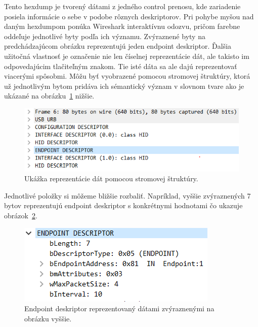 Tento hexdump je tvorený dátami z jedného control prenosu, kde zariadenie posiela informácie o sebe v podobe rôznych deskriptorov. Pri pohybe myšou nad daným hexdumpom ponúka Wireshark interaktívnu odozvu, pričom farebne oddeľuje jednotlivé byty podľa ich významu. Zvýraznené byty na predchádzajúcom obrázku reprezentujú jeden endpoint deskriptor. Ďalšia užitočná vlastnosť je označenie nie len číselnej reprezentácie dát, ale takisto im odpovedajúcim tlačiteľným znakom. Tie isté dáta sa ale dajú reprezentovať viacerými spôsobmi. Môžu byť vyobrazené pomocou stromovej štruktúry, ktorá už jednotlivým bytom pridáva ich sémantický význam v slovnom tvare ako je ukázané na obrázku~\ref{obr:uvod:tree_structure} nižšie.

\begin{figure}[!htb]
	\centering
	\includegraphics[width=\textwidth]{img/uvod_tree_structure}
	\caption{Ukážka reprezentácie dát pomocou stromovej štruktúry.}
	\label{obr:uvod:tree_structure}
\end{figure}

\newpage

 Jednotlivé položky si môžeme bližšie rozbaliť. Napríklad, vyššie zvýraznených 7 bytov reprezentujú endpoint deskriptor s konkrétnymi hodnotami čo ukazuje obrázok~\ref{obr:uvod:endpoint}.

\begin{figure}[!htb]
	\centering
	\includegraphics[width=\textwidth]{img/uvod_endpoint}
	\caption{Endpoint deskriptor reprezentovaný dátami zvýraznenými na obrázku vyššie.}
	\label{obr:uvod:endpoint}
\end{figure}

